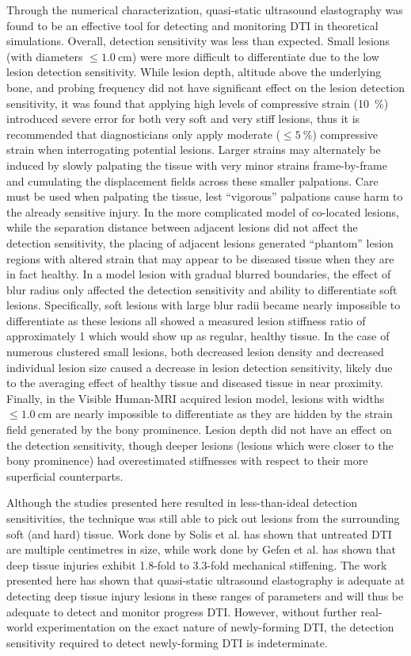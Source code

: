 		Through the numerical characterization, quasi-static ultrasound elastography was found to be an effective tool for detecting and monitoring DTI in theoretical simulations. Overall, detection sensitivity was less than expected. Small lesions (with diameters $\leq \SI{1.0}{\cm}$) were more difficult to differentiate due to the low lesion detection sensitivity. While lesion depth, altitude above the underlying bone, and probing frequency did not have significant effect on the lesion detection sensitivity, it was found that applying high levels of compressive strain (\SI{10}{\percent}) introduced severe error for both very soft and very stiff lesions, thus it is recommended that diagnosticians only apply moderate ($\leq \SI{5}{\percent}$) compressive strain when interrogating potential lesions. Larger strains may alternately be induced by slowly palpating the tissue with very minor strains frame-by-frame and cumulating the displacement fields across these smaller palpations. Care must be used when palpating the tissue, lest ``vigorous'' palpations cause harm to the already sensitive injury. In the more complicated model of co-located lesions, while the separation distance between adjacent lesions did not affect the detection sensitivity, the placing of adjacent lesions generated ``phantom'' lesion regions with altered strain that may appear to be diseased tissue when they are in fact healthy. In a model lesion with gradual blurred boundaries, the effect of blur radius only affected the detection sensitivity and ability to differentiate soft lesions. Specifically, soft lesions with large blur radii became nearly impossible to differentiate as these lesions all showed a measured lesion stiffness ratio of approximately 1 which would show up as regular, healthy tissue. In the case of numerous clustered small lesions, both decreased lesion density and decreased individual lesion size caused a decrease in lesion detection sensitivity, likely due to the averaging effect of healthy tissue and diseased tissue in near proximity. Finally, in the Visible Human-MRI acquired lesion model, lesions with widths $\leq \SI{1.0}{\cm}$ are nearly impossible to differentiate as they are hidden by the strain field generated by the bony prominence. Lesion depth did not have an effect on the detection sensitivity, though deeper lesions (lesions which were closer to the bony prominence) had overestimated stiffnesses with respect to their more superficial counterparts.

		Although the studies presented here resulted in less-than-ideal detection sensitivities, the technique was still able to pick out lesions from the surrounding soft (and hard) tissue. Work done by Solis et al. \cite{solis13} has shown that untreated DTI are multiple centimetres in size, while work done by Gefen et al. \cite{gefen05} has shown that deep tissue injuries exhibit 1.8-fold to 3.3-fold mechanical stiffening. The work presented here has shown that quasi-static ultrasound elastography is adequate at detecting deep tissue injury lesions in these ranges of parameters and will thus be adequate to detect and monitor progress DTI. However, without further real-world experimentation on the exact nature of newly-forming DTI, the detection sensitivity required to detect newly-forming DTI is indeterminate.

